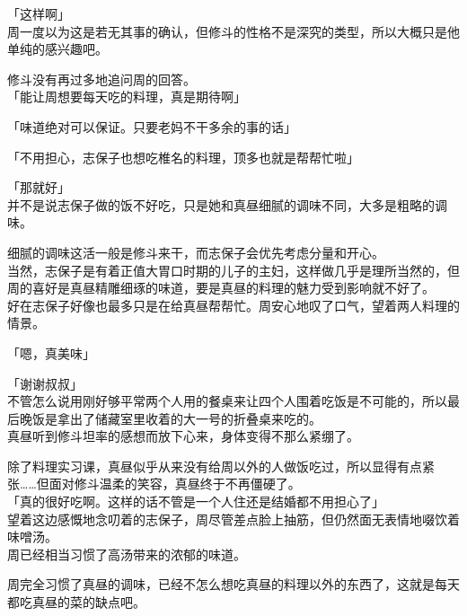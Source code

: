 「这样啊」\\

周一度以为这是若无其事的确认，但修斗的性格不是深究的类型，所以大概只是他单纯的感兴趣吧。

修斗没有再过多地追问周的回答。\\

「能让周想要每天吃的料理，真是期待啊」

「味道绝对可以保证。只要老妈不干多余的事的话」

「不用担心，志保子也想吃椎名的料理，顶多也就是帮帮忙啦」

「那就好」\\

并不是说志保子做的饭不好吃，只是她和真昼细腻的调味不同，大多是粗略的调味。

细腻的调味这活一般是修斗来干，而志保子会优先考虑分量和开心。\\

当然，志保子是有着正值大胃口时期的儿子的主妇，这样做几乎是理所当然的，但周的喜好是真昼精雕细琢的味道，要是真昼的料理的魅力受到影响就不好了。\\

好在志保子好像也最多只是在给真昼帮帮忙。周安心地叹了口气，望着两人料理的情景。\\

\vspace{2\baselineskip}

「嗯，真美味」

「谢谢叔叔」\\

不管怎么说用刚好够平常两个人用的餐桌来让四个人围着吃饭是不可能的，所以最后晚饭是拿出了储藏室里收着的大一号的折叠桌来吃的。\\

真昼听到修斗坦率的感想而放下心来，身体变得不那么紧绷了。

除了料理实习课，真昼似乎从来没有给周以外的人做饭吃过，所以显得有点紧张……但面对修斗温柔的笑容，真昼终于不再僵硬了。\\

「真的很好吃啊。这样的话不管是一个人住还是结婚都不用担心了」\\

望着这边感慨地念叨着的志保子，周尽管差点脸上抽筋，但仍然面无表情地啜饮着味噌汤。\\

周已经相当习惯了高汤带来的浓郁的味道。

周完全习惯了真昼的调味，已经不怎么想吃真昼的料理以外的东西了，这就是每天都吃真昼的菜的缺点吧。\\

